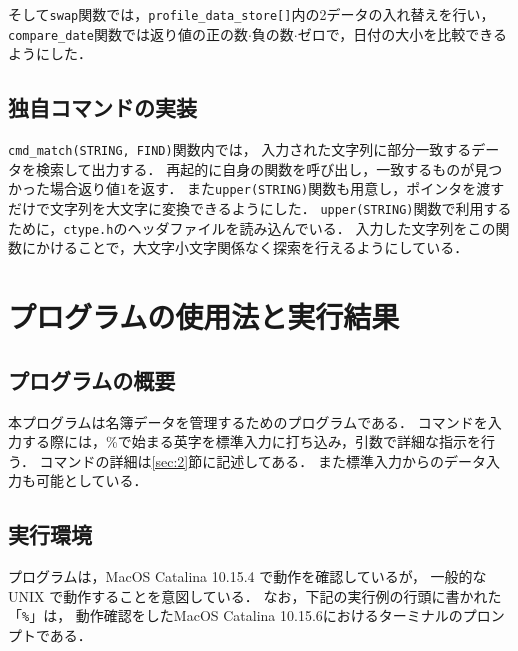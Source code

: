 \documentclass[autodetect-engine,dvi=dvipdfmx,ja=standard,
               a4j,11pt]{bxjsarticle}
\begin{document}
そして\verb|swap|関数では，\verb|profile_data_store[]|内の2データの入れ替えを行い，
\verb|compare_date|関数では返り値の正の数$\cdot$負の数$\cdot$ゼロで，日付の大小を比較できるようにした．

\subsection{独自コマンドの実装}

\verb|cmd_match(STRING, FIND)|関数内では，
入力された文字列に部分一致するデータを検索して出力する．
再起的に自身の関数を呼び出し，一致するものが見つかった場合返り値$1$を返す．
また\verb|upper(STRING)|関数も用意し，ポインタを渡すだけで文字列を大文字に変換できるようにした．
\verb|upper(STRING)|関数で利用するために，\verb|ctype.h|のヘッダファイルを読み込んでいる．
入力した文字列をこの関数にかけることで，大文字小文字関係なく探索を行えるようにしている．


\section{プログラムの使用法と実行結果} \label{sec:4}

\subsection{プログラムの概要}

本プログラムは名簿データを管理するためのプログラムである．
コマンドを入力する際には，\%で始まる英字を標準入力に打ち込み，引数で詳細な指示を行う．
コマンドの詳細は\ref{sec:2}節に記述してある．
また標準入力からのデータ入力も可能としている．

\subsection{実行環境}

プログラムは，MacOS Catalina 10.15.4 で動作を確認しているが，
一般的な UNIX で動作することを意図している．
なお，下記の実行例の行頭に書かれた「\verb|%|」は，
動作確認をしたMacOS Catalina 10.15.6におけるターミナルのプロンプトである．
\end{document}
